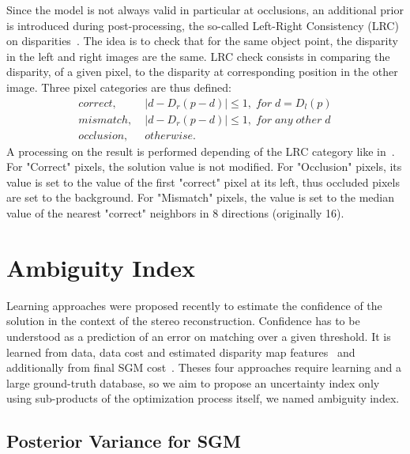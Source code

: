\documentclass{article}
\begin{document}
Since the model is not always valid in particular at occlusions, an additional prior is introduced during post-processing, the so-called Left-Right Consistency (LRC) on disparities~\cite{mei11}. The idea is to check that for the same object point, the disparity in the left and right images are the same. LRC check consists in comparing the disparity, of a given pixel, to the disparity at corresponding position in the other image. Three pixel categories are thus defined:
\begin{equation}
\begin{split}
correct, & \; |d - D_r(p- d)| \leq 1, \; for \; d=D_l(p) \\
mismatch, & \; |d - D_r(p- d)| \leq 1, \; for \; any \; other \; d \\
occlusion, & \; otherwise.
\end{split}
\end{equation}
A processing on the result is performed depending of the LRC category like in~\cite{zbontar16}. For "Correct" pixels, the solution value is not modified. For "Occlusion" pixels, its value is set to the value of the first "correct" pixel at its left, thus occluded pixels are set to the background. For "Mismatch" pixels, the value is set to the median value of the nearest "correct" neighbors in 8 directions (originally 16).

\section{Ambiguity Index}

Learning approaches were proposed recently to estimate the confidence of the solution in the context of the stereo reconstruction. Confidence has to be understood as a prediction of an error on matching over a given threshold. It is learned from data, data cost and estimated disparity map features~\cite{spyropoulos14, park15, seki16} and additionally from final SGM cost~\cite{haeusler13}. Theses four approaches require learning and a large ground-truth database, so we aim to propose an uncertainty index only using sub-products of the optimization process itself, we named ambiguity index.

\subsection{Posterior Variance for SGM}
\end{document}
